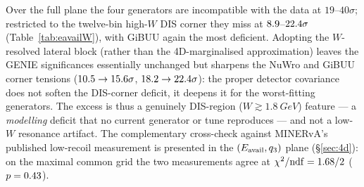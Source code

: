 Over the full plane the four generators are incompatible with the data at
$19$--$40\sigma$; restricted to the twelve-bin high-$W$ DIS corner they miss
at $8.9$--$22.4\sigma$ (Table~\ref{tab:eavailW}), with GiBUU again the most
deficient. Adopting the $W$-resolved lateral block (rather than the
4D-marginalised approximation) leaves the GENIE significances essentially
unchanged but sharpens the NuWro and GiBUU corner tensions
($10.5\to15.6\sigma$, $18.2\to22.4\sigma$): the proper detector covariance
does not soften the DIS-corner deficit, it deepens it for the worst-fitting
generators. The excess is thus a genuinely DIS-region
($W\gtrsim\SI{1.8}{GeV}$) feature --- a \emph{modelling} deficit that no
current generator or tune reproduces --- and not a low-$W$ resonance
artifact. The complementary cross-check against MINERvA's published
low-recoil measurement is presented in the $(E_{\mathrm{avail}},q_{3})$ plane
(\S\ref{sec:4d}): on the maximal common grid the two measurements agree at
$\chi^{2}/\mathrm{ndf}=1.68/2$ ($p=0.43$).
